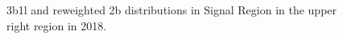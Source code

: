 \begin{figure}[ht]
 
 
    \caption{3b1l and reweighted 2b distributions in Signal Region in the upper right region in 2018.}
    \label{fig:upper-right-3b1l-SR-2018}
\end{figure}


